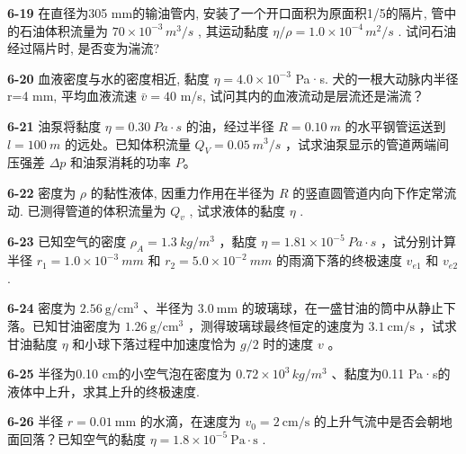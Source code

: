 \vfill

\newpage

\textbf{6-19} 在直径为305 mm的输油管内, 安装了一个开口面积为原面积1/5的隔片, 管中的石油体积流量为 $70 \times 10^{-3} \, m^{3}/s$ , 其运动黏度 $\eta/\rho = 1.0 \times 10^{-4} \, m^{2}/s$ . 试问石油经过隔片时, 是否变为湍流?


\vfill

\textbf{6-20} 血液密度与水的密度相近, 黏度 $\eta=4.0\times10^{-3}$ Pa·s. 犬的一根大动脉内半径 r=4 mm, 平均血液流速 $\bar{v}=40$ m/s, 试问其内的血液流动是层流还是湍流？

\vfill

\newpage

\textbf{6-21} 油泵将黏度 $\eta=0.30\ Pa\cdot s$ 的油，经过半径 $R=0.10\ m$ 的水平钢管运送到 $l=100\ m$ 的远处。已知体积流量 $Q_{V}=0.05\ m^{3}/s$ ，试求油泵显示的管道两端间压强差 $\Delta p$ 和油泵消耗的功率 $P$。

\vfill

\textbf{6-22} 密度为 $\rho$ 的黏性液体, 因重力作用在半径为 $R$ 的竖直圆管道内向下作定常流动. 已测得管道的体积流量为 $Q_{v}$ , 试求液体的黏度 $\eta$ .

\vfill

\newpage

\textbf{6-23} 已知空气的密度 $\rho_{A}=1.3\ kg/m^{3}$ ，黏度 $\eta=1.81\times10^{-5}\ Pa\cdot s$ ，试分别计算半径 $r_{1}=1.0\times10^{-3}\ mm$ 和 $r_{2}=5.0\times10^{-2}\ mm$ 的雨滴下落的终极速度 $v_{e1}$ 和 $v_{e2}$ .

\vfill

\textbf{6-24} 密度为 $2.56 \mathrm{~g} / \mathrm{cm}^{3}$ 、半径为 $3.0 \mathrm{~mm}$ 的玻璃球，在一盛甘油的筒中从静止下落。已知甘油密度为 $1.26 \mathrm{~g} / \mathrm{cm}^{3}$ ，测得玻璃球最终恒定的速度为 $3.1 \mathrm{~cm} / \mathrm{s}$ ，试求甘油黏度 $\eta$ 和小球下落过程中加速度恰为 $g / 2$ 时的速度 $v$ 。

\vfill

\newpage

\textbf{6-25} 半径为0.10 cm的小空气泡在密度为 $0.72 \times 10^{3} \, kg/m^{3}$ 、黏度为0.11 Pa·s的液体中上升，求其上升的终极速度.

\vfill

\textbf{6-26} 半径 $r = 0.01 \mathrm{~mm}$ 的水滴，在速度为 $v_{0} = 2 \mathrm{~cm} / \mathrm{s}$ 的上升气流中是否会朝地面回落？已知空气的黏度 $\eta = 1.8 \times 10^{-5} \mathrm{~Pa} \cdot \mathrm{s}$ .

\vfill

\newpage

